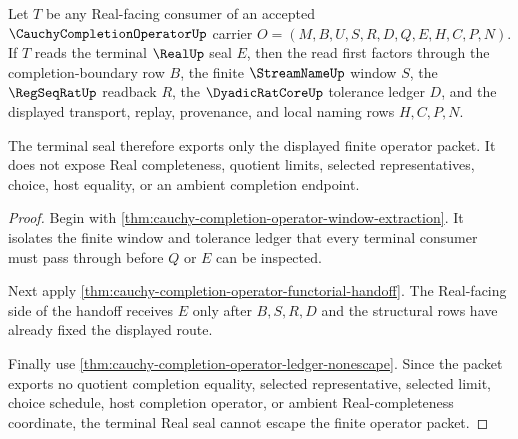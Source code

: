\begin{theorem}
\label{thm:cauchy-completion-operator-real-seal-nonescape}
Let $T$ be any Real-facing consumer of an accepted $\CauchyCompletionOperatorUp$ carrier $O=(M,B,U,S,R,D,Q,E,H,C,P,N)$. If $T$ reads the terminal $\RealUp$ seal $E$, then the read first factors through the completion-boundary row $B$, the finite $\StreamNameUp$ window $S$, the $\RegSeqRatUp$ readback $R$, the $\DyadicRatCoreUp$ tolerance ledger $D$, and the displayed transport, replay, provenance, and local naming rows $H,C,P,N$.

The terminal seal therefore exports only the displayed finite operator packet. It does not expose Real completeness, quotient limits, selected representatives, choice, host equality, or an ambient completion endpoint.
\end{theorem}
\begin{proof}
Begin with \autoref{thm:cauchy-completion-operator-window-extraction}. It isolates the finite window and tolerance ledger that every terminal consumer must pass through before $Q$ or $E$ can be inspected.

Next apply \autoref{thm:cauchy-completion-operator-functorial-handoff}. The Real-facing side of the handoff receives $E$ only after $B,S,R,D$ and the structural rows have already fixed the displayed route.

Finally use \autoref{thm:cauchy-completion-operator-ledger-nonescape}. Since the packet exports no quotient completion equality, selected representative, selected limit, choice schedule, host completion operator, or ambient Real-completeness coordinate, the terminal Real seal cannot escape the finite operator packet.
\end{proof}

